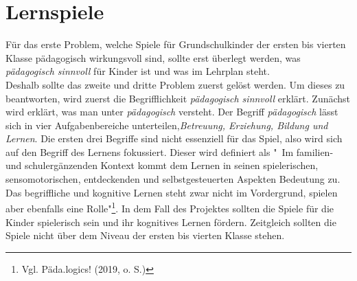 \section{Lernspiele}
Für das erste Problem, welche Spiele für Grundschulkinder der ersten bis vierten Klasse pädagogisch wirkungsvoll sind, sollte erst überlegt werden, was \textit{pädagogisch sinnvoll} für Kinder ist und was im Lehrplan steht.\\
Deshalb sollte das zweite und dritte Problem zuerst gelöst werden. Um dieses zu beantworten, wird zuerst die Begrifflichkeit \textit{pädagogisch sinnvoll} erklärt.  Zunächst wird erklärt, was man unter \textit{pädagogisch} versteht. Der Begriff \textit{pädagogisch} lässt sich in vier Aufgabenbereiche unterteilen,\textit{Betreuung, Erziehung, Bildung und Lernen}. Die ersten drei Begriffe sind nicht essenziell für das Spiel, also wird sich auf den Begriff des Lernens fokussiert. Dieser wird definiert als "\ Im familien- und schulergänzenden Kontext kommt dem Lernen in seinen spielerischen, sensomotorischen, entdeckenden und selbstgesteuerten Aspekten Bedeutung zu. Das begriffliche und kognitive Lernen steht zwar nicht im Vordergrund, spielen aber ebenfalls eine Rolle"\footnote{Vgl. Päda.logics! (2019, o. S.)}. %
In dem Fall des Projektes sollten die Spiele für die Kinder spielerisch sein und ihr kognitives Lernen fördern. Zeitgleich sollten die Spiele nicht über dem Niveau der ersten bis vierten Klasse stehen.\\

